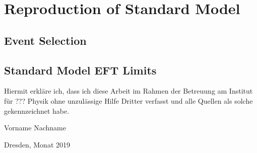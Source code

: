 \pagebreak
\chapter{Reproduction of Standard Model}
    \section{Event Selection}
        

   \section{Standard Model EFT Limits}
        





\clearpage
\thispagestyle{empty}
\vspace*{1.5em}

Hiermit erkläre ich, dass ich diese Arbeit im Rahmen der Betreuung am Institut
für ??? Physik ohne unzulässige Hilfe Dritter verfasst und alle Quellen als solche gekennzeichnet habe.

\vspace*{45em}

Vorname Nachname \par
Dresden, Monat 2019
